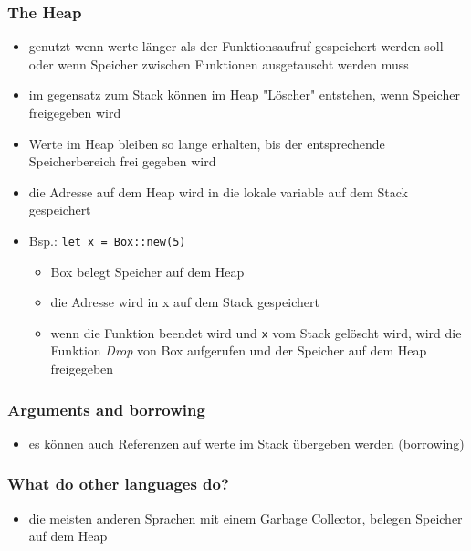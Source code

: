 \documentclass[a4paper,12pt]{article}
\begin{document}
\subsubsection*{The Heap}
	\begin{itemize}
	  \item genutzt wenn werte länger als der Funktionsaufruf gespeichert werden soll oder wenn Speicher zwischen Funktionen ausgetauscht werden muss
	  \item im gegensatz zum Stack können im Heap "Löscher" entstehen, wenn Speicher freigegeben wird
	  \item Werte im Heap bleiben so lange erhalten, bis der entsprechende  Speicherbereich frei gegeben wird
	  \item 	die Adresse auf dem Heap wird in die lokale variable auf dem Stack gespeichert
	  \newpage
	  \item Bsp.: \verb|let x = Box::new(5)|
	  \begin{itemize}
	    \item Box belegt Speicher auf dem Heap
	    \item die Adresse wird in x auf dem Stack gespeichert
	    \item wenn die Funktion beendet wird und \verb|x| vom Stack gelöscht wird, wird die Funktion \textit{Drop} von Box aufgerufen und der Speicher auf dem Heap freigegeben
	  \end{itemize}
	 \end{itemize}

\subsubsection*{Arguments and borrowing}
	\begin{itemize}
	  \item es können auch Referenzen auf werte im Stack übergeben werden (borrowing)
	\end{itemize}
	
\subsubsection*{What do other languages do?}
	\begin{itemize}
	  \item die meisten anderen Sprachen mit einem Garbage Collector, belegen Speicher auf dem Heap 
	\end{itemize}
	
\end{document}
